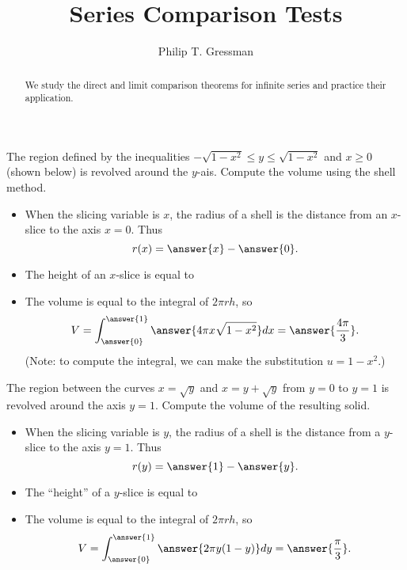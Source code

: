 \documentclass{ximera}
\title{Series Comparison Tests}
\author{Philip T. Gressman}
\begin{document}
\begin{abstract}
We study the direct and limit comparison theorems for infinite series and practice their application.
\end{abstract}
\maketitle

\begin{example}
The region defined by the inequalities $-\sqrt{1-x^2} \leq y \leq \sqrt{1-x^2}$ and $x \geq 0$ (shown below) is revolved around the $y$-ais. Compute the volume using the shell method.

\begin{itemize}
\item When the slicing variable is $x$, the radius of a shell is the  distance from an $x$-slice to the axis $x = 0$. Thus
\[ r(x) = \answer{x} - \answer{0}. \]
\item The height of an $x$-slice is equal to
\begin{multipleChoice}
\end{multipleChoice}
\item The volume is equal to the integral of $2 \pi r h$, so 
\[ V = \int_{\answer{0}}^{\answer{1}} \answer{4 \pi x \sqrt{1-x^2}} dx = \answer{\frac{4\pi}{3}}. \]
(Note: to compute the integral, we can make the substitution $u = 1-x^2$.)
\end{itemize}
\end{example}

\begin{example}
The region between the curves $x = \sqrt{y}$ and $x = y + \sqrt{y}$ from $y=0$ to $y=1$ is revolved around the axis $y=1$. Compute the volume of the resulting solid.

\begin{itemize}
\item When the slicing variable is $y$, the radius of a shell is the  distance from a $y$-slice to the axis $y = 1$. Thus
\[ r(y) = \answer{1} - \answer{y}. \]
\item The ``height'' of a $y$-slice is equal to
\begin{multipleChoice}
\end{multipleChoice}
\item The volume is equal to the integral of $2 \pi r h$, so 
\[ V = \int_{\answer{0}}^{\answer{1}} \answer{2 \pi y(1-y)} dy = \answer{\frac{\pi}{3}}. \]
\end{itemize}
\end{example}
\end{document}
